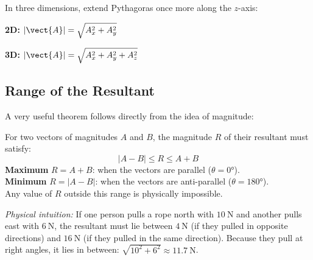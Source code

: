 \begin{diagbox}
\begin{center}
\end{center}
\end{diagbox}

In three dimensions, extend Pythagoras once more along
the $z$-axis:

\begin{lawbox}
\textbf{2D:}\quad
$|\vect{A}| = \sqrt{A_x^2 + A_y^2}$

\vspace{0.3cm}

\textbf{3D:}\quad
$|\vect{A}| = \sqrt{A_x^2 + A_y^2 + A_z^2}$
\end{lawbox}

\subsection*{Range of the Resultant}

A very useful theorem follows directly from the idea
of magnitude:

\begin{lawbox}
For two vectors of magnitudes $A$ and $B$, the
magnitude $R$ of their resultant must satisfy:
\[
  |A - B| \leq R \leq A + B
\]
\textbf{Maximum} $R = A + B$: when the vectors are
parallel ($\theta = 0°$).\\
\textbf{Minimum} $R = |A - B|$: when the vectors are
anti-parallel ($\theta = 180°$).\\
Any value of $R$ outside this range is physically
impossible.
\end{lawbox}

\noindent \textit{Physical intuition:} If one person pulls a rope
north with $10\ \text{N}$ and another pulls east with $6\ \text{N}$,
the resultant must lie between $4\ \text{N}$ (if they pulled in
opposite directions) and $16\ \text{N}$ (if they pulled in the same
direction). Because they pull at right angles, it lies in between:
$\sqrt{10^{2}+6^{2}} \approx 11.7\ \text{N}$.

